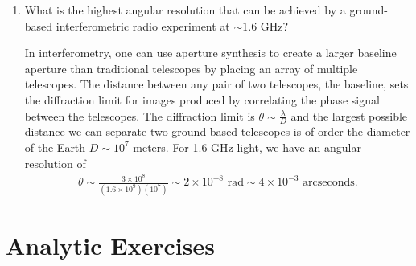 \begin{enumerate}
\item What is the highest angular resolution that can be achieved by a
    ground-based interferometric radio experiment at $\sim 1.6$ GHz?

\begin{answer}
In interferometry, one can use aperture synthesis to create a larger
baseline aperture than traditional telescopes by placing an array of
multiple telescopes. The distance between any pair of two telescopes,
the baseline, sets the diffraction limit for images produced by
correlating the phase signal between the telescopes.  The diffraction
limit is $\theta\sim \frac{\lambda}{D}$ and the largest possible
distance we can separate two ground-based telescopes is of order the
diameter of the Earth $D\sim 10^7$ meters. For 1.6 GHz light, we have
an angular resolution of
\begin{align*}
    \theta\sim \frac{3\times 10^8}{(1.6\times 10^9)(10^7)}\sim 2\times 10^{-8} \textrm{ rad}\sim 4\times 10^{-3} \textrm{ arcseconds}.
\end{align*}
\end{answer}
\end{enumerate} 

\section{Analytic Exercises}

